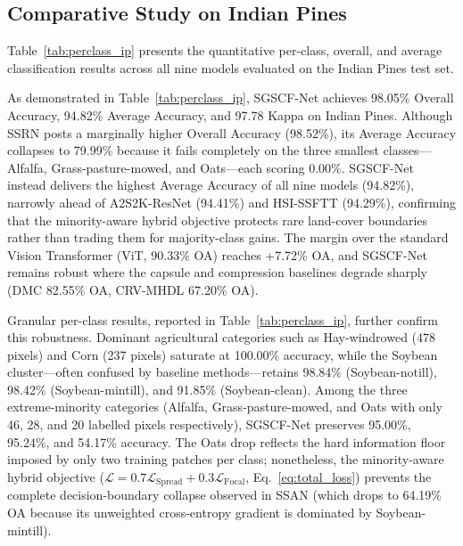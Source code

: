 \documentclass[manuscript,screen,review]{acmart}
\begin{document}
\subsection{Comparative Study on Indian Pines}
\label{subsec:comparative_study}
Table~\ref{tab:perclass_ip} presents the quantitative per-class, overall, and average classification results across all nine models evaluated on the Indian Pines test set.

As demonstrated in Table~\ref{tab:perclass_ip}, SGSCF-Net achieves 98.05\% Overall Accuracy, 94.82\% Average Accuracy, and 97.78 Kappa on Indian Pines. Although SSRN posts a marginally higher Overall Accuracy (98.52\%), its Average Accuracy collapses to 79.99\% because it fails completely on the three smallest classes---Alfalfa, Grass-pasture-mowed, and Oats---each scoring 0.00\%. SGSCF-Net instead delivers the highest Average Accuracy of all nine models (94.82\%), narrowly ahead of A2S2K-ResNet (94.41\%) and HSI-SSFTT (94.29\%), confirming that the minority-aware hybrid objective protects rare land-cover boundaries rather than trading them for majority-class gains. The margin over the standard Vision Transformer (ViT, 90.33\% OA) reaches +7.72\% OA, and SGSCF-Net remains robust where the capsule and compression baselines degrade sharply (DMC 82.55\% OA, CRV-MHDL 67.20\% OA).

Granular per-class results, reported in Table~\ref{tab:perclass_ip}, further confirm this robustness. Dominant agricultural categories such as Hay-windrowed (478 pixels) and Corn (237 pixels) saturate at 100.00\% accuracy, while the Soybean cluster---often confused by baseline methods---retains 98.84\% (Soybean-notill), 98.42\% (Soybean-mintill), and 91.85\% (Soybean-clean). Among the three extreme-minority categories (Alfalfa, Grass-pasture-mowed, and Oats with only 46, 28, and 20 labelled pixels respectively), SGSCF-Net preserves 95.00\%, 95.24\%, and 54.17\% accuracy. The Oats drop reflects the hard information floor imposed by only two training patches per class; nonetheless, the minority-aware hybrid objective ($\mathcal{L} = 0.7\mathcal{L}_{\text{Spread}} + 0.3\mathcal{L}_{\text{Focal}}$, Eq.~\ref{eq:total_loss}) prevents the complete decision-boundary collapse observed in SSAN (which drops to 64.19\% OA because its unweighted cross-entropy gradient is dominated by Soybean-mintill).
\end{document}
